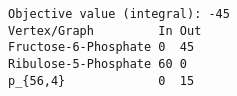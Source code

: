 \begin{verbatim}
Objective value (integral): -45
Vertex/Graph         In Out 
Fructose-6-Phosphate 0  45  
Ribulose-5-Phosphate 60 0   
p_{56,4}             0  15  
\end{verbatim}
